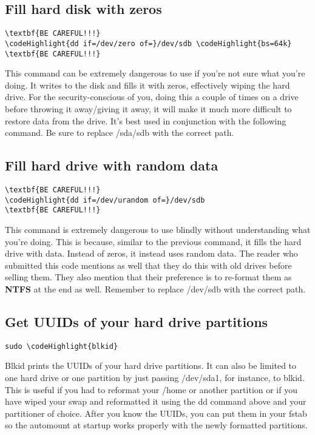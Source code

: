 \documentclass[12pt,a4paper]{article}
\begin{document}
\subsection{Fill hard disk with zeros}
\begin{Verbatim}[commandchars=\\\{\}]
\textbf{BE CAREFUL!!!}
\codeHighlight{dd if=/dev/zero of=}/dev/sdb \codeHighlight{bs=64k}
\textbf{BE CAREFUL!!!}
\end{Verbatim}
This command can be extremely dangerous to use if you're not sure what you're doing. It writes to the disk and fills it with zeros, effectively wiping the hard drive.  For the security-conscious of you, doing this a couple of times on a drive before throwing it away/giving it away, it will make it much more difficult to restore data from the drive. It's best used in conjunction with the following command. Be sure to replace /sda/sdb with the correct path.

\subsection{Fill hard drive with random data}
\begin{Verbatim}[commandchars=\\\{\}]
\textbf{BE CAREFUL!!!}
\codeHighlight{dd if=/dev/urandom of=}/dev/sdb
\textbf{BE CAREFUL!!!}
\end{Verbatim}
This command is extremely dangerous to use blindly without understanding what you're doing. This is because, similar to the previous command, it fills the hard drive with data. Instead of zeros, it instead uses random data. The reader who submitted this code mentions as well that they do this with old drives before selling them. They also mention that their preference is to re-format them as \textbf{NTFS} at the end as well.  Remember to replace /dev/sdb with the correct path.

\subsection{Get UUIDs of your hard drive partitions}
\begin{Verbatim}[commandchars=\\\{\}]
sudo \codeHighlight{blkid}
\end{Verbatim}
Blkid prints the UUIDs of your hard drive partitions. It can also be limited to one hard drive or one partition by just passing /dev/sda1, for instance, to blkid. This is useful if you had to reformat your /home or another partition or if you have wiped your swap and reformatted it using the dd command above and your partitioner of choice. After you know the UUIDs, you can put them in your fstab so the automount at startup works properly with the newly formatted partitions.
\end{document}
